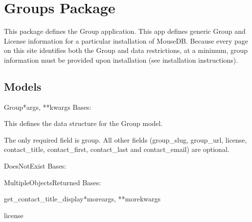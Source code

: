 \documentclass[letterpaper,10pt,english]{sphinxmanual}
\begin{document}
\section{Groups Package}
\hypertarget{module-groups}{}
\modulesynopsis{}
This package defines the Group application.
This app defines generic Group and License information for a particular installation of MouseDB.  
Because every page on this site identifies both the Group and data restrictions, at a minimum, group information must be provided upon installation (see installation instructions).


\subsection{Models}
\hypertarget{module-groups.models}{}
\modulesynopsis{}

\hypertarget{groups.models.Group}{}\begin{classdesc}{Group}{*args, **kwargs}
Bases: 

This defines the data structure for the Group model.

The only required field is group.
All other fields (group\_slug, group\_url, license, contact\_title, contact\_first, contact\_last and contact\_email) are optional.

\hypertarget{groups.models.Group.DoesNotExist}{}\begin{excdesc}{DoesNotExist}
Bases: 
\end{excdesc}

\hypertarget{groups.models.Group.MultipleObjectsReturned}{}\begin{excdesc}{MultipleObjectsReturned}
Bases: 
\end{excdesc}

\hypertarget{groups.models.Group.get\_contact\_title\_display}{}\begin{methoddesc}[Group]{get\_contact\_title\_display}{*moreargs, **morekwargs}\end{methoddesc}

\hypertarget{groups.models.Group.license}{}\begin{memberdesc}[Group]{license}\end{memberdesc}
\end{classdesc}
\end{document}
